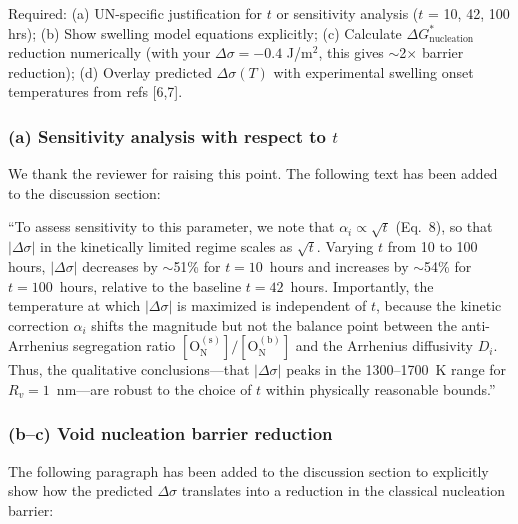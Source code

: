 \documentclass[12pt]{article}
\begin{document}
Required: (a) UN-specific justification for $t$ or sensitivity analysis ($t$ = 10, 42, 100 hrs); (b) Show swelling model equations explicitly; (c) Calculate $\Delta G^*_\text{nucleation}$ reduction numerically (with your $\Delta \sigma = -0.4$ J/m$^2$, this gives $\sim$2$\times$ barrier reduction); (d) Overlay predicted $\Delta \sigma(T)$ with experimental swelling onset temperatures from refs [6,7].

\color{black}


\subsubsection*{(a) Sensitivity analysis with respect to $t$}

We thank the reviewer for raising this point. The following text has been added to the discussion section:

\color{red} ``To assess sensitivity to this parameter, we note that $\alpha_i \propto \sqrt{t}$ (Eq.~8), so that $|\Delta \sigma|$ in the kinetically limited regime scales as $\sqrt{t}$. Varying $t$ from 10 to 100 hours, $|\Delta \sigma|$ decreases by $\sim$51\% for $t = 10$~hours and increases by $\sim$54\% for $t = 100$~hours, relative to the baseline $t = 42$~hours. Importantly, the temperature at which $|\Delta \sigma|$ is maximized is independent of $t$, because the kinetic correction $\alpha_i$ shifts the magnitude but not the balance point between the anti-Arrhenius segregation ratio $[\text{O}_\text{N}^{(\text{s})}]/[\text{O}_\text{N}^{(\text{b})}]$ and the Arrhenius diffusivity $D_i$. Thus, the qualitative conclusions---that $|\Delta \sigma|$ peaks in the 1300--1700~K range for $R_v = 1$~nm---are robust to the choice of $t$ within physically reasonable bounds.''

\color{black}

\subsubsection*{(b--c) Void nucleation barrier reduction}

The following paragraph has been added to the discussion section to explicitly show how the predicted $\Delta \sigma$ translates into a reduction in the classical nucleation barrier:

\color{red}
\end{document}
